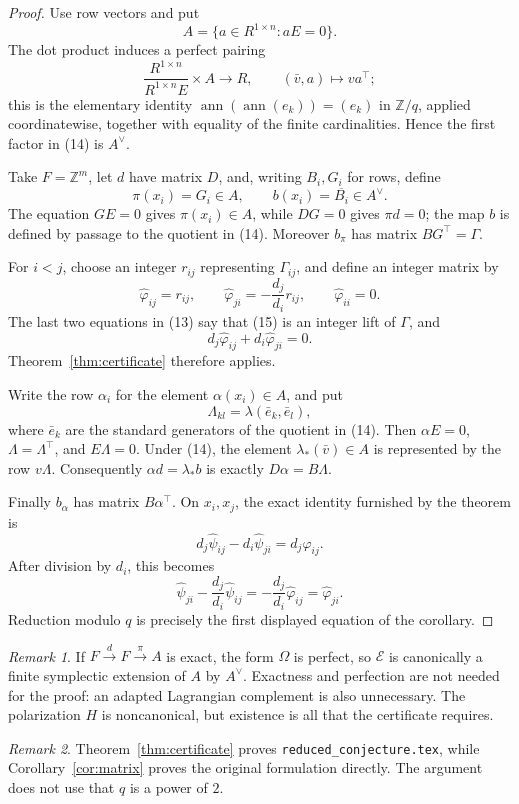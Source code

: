 \documentclass[11pt]{article}
\newcommand{\Z}{\mathbb Z}
\theoremstyle{remark}
\newtheorem*{remark}{Remark}
\begin{document}
\begin{proof}
Use row vectors and put
\[
 A=\{a\in R^{1\times n}:aE=0\}.
\]
The dot product induces a perfect pairing
\[
 \frac{R^{1\times n}}{R^{1\times n}E}\times A\longrightarrow R,
 \qquad(\bar v,a)\longmapsto va^\top;                         \tag{14}
\]
this is the elementary identity
\(\operatorname{ann}(\operatorname{ann}(e_k))=(e_k)\) in
\(\Z/q\), applied coordinatewise, together with equality of the
finite cardinalities.  Hence the first factor in (14) is \(A^\lor\).

Take \(F=\Z^m\), let \(d\) have matrix \(D\), and, writing \(B_i,G_i\)
for rows, define
\[
                 \pi(x_i)=G_i\in A,\qquad
                 b(x_i)=\overline{B_i}\in A^\lor .
\]
The equation \(GE=0\) gives \(\pi(x_i)\in A\), while \(DG=0\) gives
\(\pi d=0\); the map \(b\) is defined by passage to the quotient in
(14).  Moreover \(b_\pi\) has matrix \(BG^\top=\Gamma\).

For \(i<j\), choose an integer \(r_{ij}\) representing
\(\Gamma_{ij}\), and define an integer matrix by
\[
 \widehat\varphi_{ij}=r_{ij},\qquad
 \widehat\varphi_{ji}=-\frac{d_j}{d_i}r_{ij},\qquad
 \widehat\varphi_{ii}=0.                                    \tag{15}
\]
The last two equations in (13) say that (15) is an integer lift of
\(\Gamma\), and
\[
 d_j\widehat\varphi_{ij}+d_i\widehat\varphi_{ji}=0.
\]
Theorem~\ref{thm:certificate} therefore applies.

Write the row \(\alpha_i\) for the element \(\alpha(x_i)\in A\), and
put
\[
 \Lambda_{kl}
   =\lambda(\bar e_k,\bar e_l),
\]
where \(\bar e_k\) are the standard generators of the quotient in
(14).  Then \(\alpha E=0\), \(\Lambda=\Lambda^\top\), and
\(E\Lambda=0\).  Under (14), the element
\(\lambda_*(\bar v)\in A\) is represented by the row \(v\Lambda\).
Consequently \(\alpha d=\lambda_*b\) is exactly
\(D\alpha=B\Lambda\).

Finally \(b_\alpha\) has matrix \(B\alpha^\top\).  On \(x_i,x_j\),
the exact identity furnished by the theorem is
\[
 d_j\widehat\psi_{ij}-d_i\widehat\psi_{ji}
       =d_j\widehat\varphi_{ij}.
\]
After division by \(d_i\), this becomes
\[
 \widehat\psi_{ji}-\frac{d_j}{d_i}\widehat\psi_{ij}
       =-\frac{d_j}{d_i}\widehat\varphi_{ij}
       =\widehat\varphi_{ji}.
\]
Reduction modulo \(q\) is precisely the first displayed equation of
the corollary.
\end{proof}

\begin{remark}
If \(F\xrightarrow dF\xrightarrow\pi A\) is exact, the form
\(\Omega\) is perfect, so \(\mathcal E\) is canonically a finite
symplectic extension of \(A\) by \(A^\lor\).  Exactness and perfection
are not needed for the proof: an adapted Lagrangian complement is also
unnecessary.  The polarization \(H\) is noncanonical, but existence is
all that the certificate requires.
\end{remark}

\begin{remark}
Theorem~\ref{thm:certificate} proves
\texttt{reduced\_conjecture.tex}, while
Corollary~\ref{cor:matrix} proves the original formulation directly.
The argument does not use that \(q\) is a power of \(2\).
\end{remark}
\end{document}
